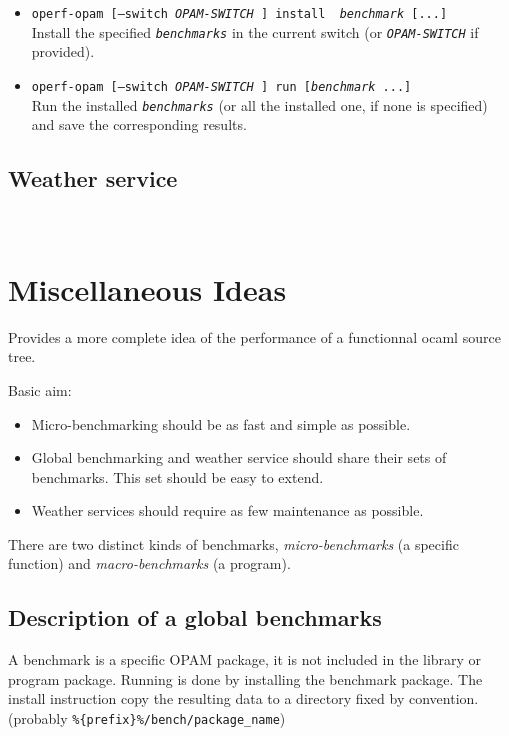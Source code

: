 \documentclass[11pt,a4paper]{article}
\begin{document}
\begin{itemize}
\item {\tt operf-opam [--switch {\em OPAM-SWITCH} ] install {\em
    benchmark} [...]}\\ Install the specified {\tt\em benchmarks} in
  the current switch (or {\tt\em OPAM-SWITCH} if provided).
\item {\tt operf-opam [--switch {\em OPAM-SWITCH} ] run [{\em benchmark} ...]}\\
  Run the installed {\tt\em benchmarks} (or all the installed one, if none
  is specified) and save the corresponding results.
\end{itemize}

\subsection{Weather service}
~\vspace{4cm}~

\section{Miscellaneous Ideas}

Provides a more complete idea of the performance of a functionnal
ocaml source tree.

Basic aim:
\begin{itemize}
\item Micro-benchmarking should be as fast and simple as possible.
\item Global benchmarking and weather service should share their sets
  of benchmarks. This set should be easy to extend.
\item Weather services should require as few maintenance as possible.
\end{itemize}

There are two distinct kinds of benchmarks, \emph{micro-benchmarks} (a specific
function) and \emph{macro-benchmarks} (a program).

\subsection{Description of a global benchmarks}

A benchmark is a specific OPAM package, it is not included in the
library or program package. Running is done by installing the
benchmark package. The install instruction copy the resulting data to
a directory fixed by convention. (probably
\texttt{\%\{prefix\}\%/bench/package\_name})
\end{document}
